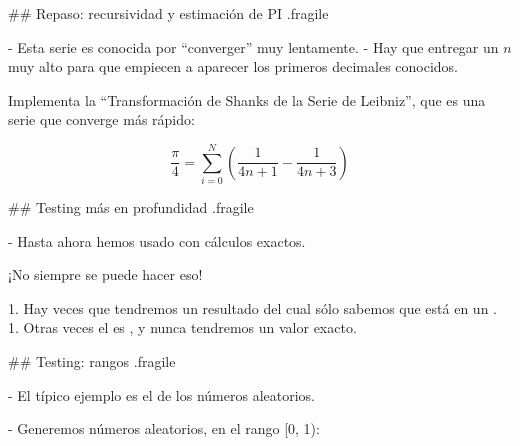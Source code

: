 


## Repaso: recursividad y estimación de PI {.fragile}


- Esta serie es conocida por ``converger'' muy lentamente.
    - Hay que entregar un $n$ muy alto para que empiecen a aparecer los primeros decimales conocidos.


\bgnblockgood
{} Implementa la ``Transformación de Shanks de la Serie de Leibniz'', que es
una serie que converge más rápido:

\vspace{-3ex}
$$ \frac{\pi}{4} = \sum_{i=0}^{N} \left( \frac{1}{4n + 1} - \frac{1}{4n + 3} \right) $$

\trmblockgood

## Testing más en profundidad {.fragile}

- Hasta ahora hemos usado  con cálculos exactos.

\pause

\bgnblockdanger
¡No siempre se puede hacer eso!
\trmblockdanger

1. Hay veces que tendremos un resultado del cual sólo sabemos que está en un .
1. Otras veces el  es , y nunca tendremos un valor exacto.

## Testing: rangos {.fragile}


- El típico ejemplo es el de los números aleatorios.

- Generemos números aleatorios, en el rango [0, 1):

